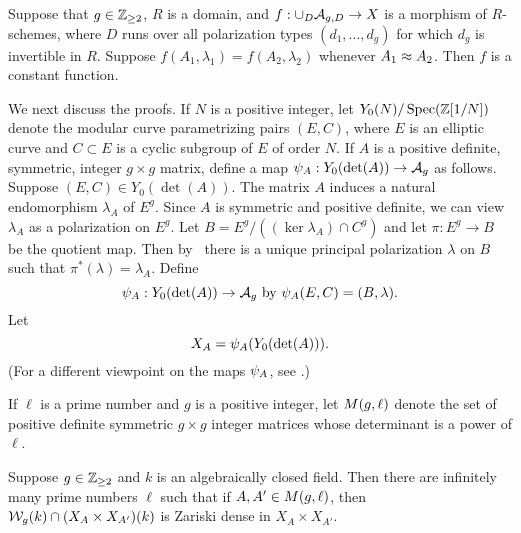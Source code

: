 \documentclass{amsart}
\begin{document}
\begin{corollary}
\label{cor:alldcor}
  Suppose that $g\in\mathbb{Z}_{\ge 2}$, $R$ is a domain, and $f: \cup_{D} \mathcal{A}_{g,{D}} \to X$ is a morphism of $R$-schemes, where $D$ runs over all polarization types $(d_1, \ldots, d_g)$ for which $d_g$ is invertible in $R$. Suppose $f(A_1,\lambda_1) = f(A_2,\lambda_2)$ whenever $A_1 \approx A_2$. Then $f$ is a constant function.
\end{corollary}




We next discuss the proofs. 
If $N$ is a positive integer, let $Y_0(N)/\operatorname{Spec}(\mathbb{Z}[1/N])$ denote the modular curve parametrizing pairs $(E, C)$, where $E$ is an elliptic curve and $C \subset E$ is a cyclic subgroup of $E$ of order $N$. If $A$ is a positive definite, symmetric, integer $g\times g$ matrix, define a map $\psi_{A}: Y_0(\det(A)) \to \mathcal{A}_g$ as follows. Suppose $(E, C) \in Y_0(\det(A))$. The matrix $A$ induces a natural endomorphism $\lambda_A$ of $E^g$. Since $A$ is symmetric and positive definite, we can view $\lambda_A$ as a polarization on $E^g$. Let $B = E^g/((\ker \lambda_A) \cap C^g)$ and let $\pi: E^g \to B$ be the quotient map. Then by~\cite[Prop.~16.8]{milne-av} there is a unique principal polarization $\lambda$ on $B$ such that $\pi^*(\lambda) = \lambda_A$. Define
\begin{equation}\label{def:psimoddef}
\psi_{A}: Y_0(\det(A)) \to \mathcal{A}_g  \text{ by } \psi_{A}(E,C) = (B,\lambda).
\end{equation}
Let
$$X_A=\psi_{A}(Y_0(\det(A))).$$
(For a different viewpoint on the maps $\psi_{A}$, see \cite[p. 19 et seq.]{rains}.)

\begin{definition}\label{def:detl}
If $\ell$ is a prime number and $g$ is a positive integer, let $M(g,\ell)$ denote the set of positive definite symmetric $g \times g$ integer matrices whose determinant is a power of $\ell$.
\end{definition}

\begin{theorem}\label{thm:Sg-dense}
  Suppose $g\in\mathbb{Z}_{\ge 2}$ and $k$ is an algebraically closed field. 
  Then there are infinitely many prime numbers $\ell$ such that if
  $A,A' \in M(g,\ell)$, then $\mathcal{W}_g(k) \cap (X_A \times X_{A'})(k)$ is Zariski dense in $X_A \times X_{A'}$.
\end{theorem}
\end{document}
